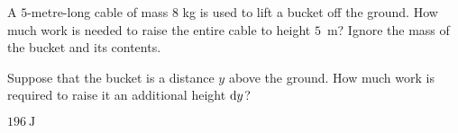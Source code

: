 \begin{Mquestion}[2016Q3]\label{prob_s2.1cable}
A $5$-metre-long cable of mass $8$ kg is used to lift
a bucket off the ground. How much work is needed
to raise the entire cable to height $5$~m? Ignore the mass of the bucket and its contents.

\end{Mquestion}

\begin{hint}
Suppose that the bucket is a distance $y$ above the ground.
How much work is required to raise it an additional height $\mathrm{d}y$?
\end{hint}

\begin{answer}
$196\ \mathrm{J}$
\end{answer}

